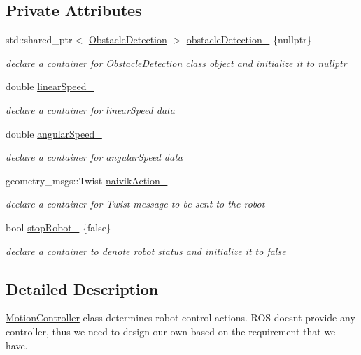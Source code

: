 \subsection*{Private Attributes}
\begin{DoxyCompactItemize}
\item 
std\+::shared\+\_\+ptr$<$ \hyperlink{classObstacleDetection}{Obstacle\+Detection} $>$ \hyperlink{classMotionController_a6c025f207fc59e04928b95404f49e396}{obstacle\+Detection\+\_\+} \{nullptr\}
\begin{DoxyCompactList}\small\item\em declare a container for \hyperlink{classObstacleDetection}{Obstacle\+Detection} class object and initialize it to nullptr \end{DoxyCompactList}\item 
double \hyperlink{classMotionController_a58fde3691cec5842a4406da860390b80}{linear\+Speed\+\_\+}
\begin{DoxyCompactList}\small\item\em declare a container for linear\+Speed data \end{DoxyCompactList}\item 
double \hyperlink{classMotionController_a04ae9f505c346ba5431ffb9ee5ba6795}{angular\+Speed\+\_\+}
\begin{DoxyCompactList}\small\item\em declare a container for angular\+Speed data \end{DoxyCompactList}\item 
geometry\+\_\+msgs\+::\+Twist \hyperlink{classMotionController_a466cdca708caaab029acad5947b3b79c}{naivik\+Action\+\_\+}
\begin{DoxyCompactList}\small\item\em declare a container for Twist message to be sent to the robot \end{DoxyCompactList}\item 
bool \hyperlink{classMotionController_a586e795cc2377ddc399f32f18da871e0}{stop\+Robot\+\_\+} \{false\}
\begin{DoxyCompactList}\small\item\em declare a container to denote robot status and initialize it to false \end{DoxyCompactList}\end{DoxyCompactItemize}


\subsection{Detailed Description}
\hyperlink{classMotionController}{Motion\+Controller} class determine\textquotesingle{}s robot control actions. R\+OS doesn\textquotesingle{}t provide any controller, thus we need to design our own based on the requirement that we have. 

